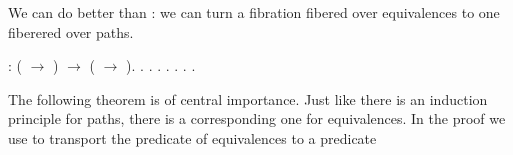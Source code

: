 \documentclass[12pt]{report}
\begin{document}
We can do better than : we can turn a fibration
     fibered over equivalences to one fiberered over paths. \begin{coqdoccode}
\coqdocemptyline
\coqdocindent{1.00em}
    : (   \ensuremath{\rightarrow} ) \ensuremath{\rightarrow} (   \ensuremath{\rightarrow} ).\coqdoceol
\coqdocindent{1.00em}
.\coqdoceol
\coqdocindent{2.00em}
  .\coqdoceol
\coqdocindent{2.00em}
  .\coqdoceol
\coqdocindent{2.00em}
 .\coqdoceol
\coqdocindent{2.00em}
 .\coqdoceol
\coqdocindent{2.00em}
 .\coqdoceol
\coqdocindent{1.00em}
.\coqdoceol
\coqdocemptyline
\end{coqdoccode}
The following theorem is of central importance. Just like there
     is an induction principle for paths, there is a corresponding one
     for equivalences. In the proof we use  to
     transport the predicate  of equivalences to a predicate 
\end{document}
